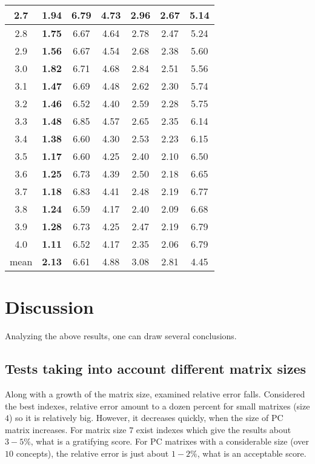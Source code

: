 \begin{table}[h]
\begin{center}
\begin{tabular}{|c||c|c|c|c|c|c|}
2.7 & \textbf{1.94} & 6.79 & 4.73 & 2.96 & 2.67 & 5.14 \\ \hline
2.8 & \textbf{1.75} & 6.67 & 4.64 & 2.78 & 2.47 & 5.24 \\ \hline
2.9 & \textbf{1.56} & 6.67 & 4.54 & 2.68 & 2.38 & 5.60 \\ \hline
3.0 & \textbf{1.82} & 6.71 & 4.68 & 2.84 & 2.51 & 5.56 \\ \hline
3.1 & \textbf{1.47} & 6.69 & 4.48 & 2.62 & 2.30 & 5.74 \\ \hline
3.2 & \textbf{1.46} & 6.52 & 4.40 & 2.59 & 2.28 & 5.75 \\ \hline
3.3 & \textbf{1.48} & 6.85 & 4.57 & 2.65 & 2.35 & 6.14 \\ \hline
3.4 & \textbf{1.38} & 6.60 & 4.30 & 2.53 & 2.23 & 6.15 \\ \hline
3.5 & \textbf{1.17} & 6.60 & 4.25 & 2.40 & 2.10 & 6.50 \\ \hline
3.6 & \textbf{1.25} & 6.73 & 4.39 & 2.50 & 2.18 & 6.65 \\ \hline
3.7 & \textbf{1.18} & 6.83 & 4.41 & 2.48 & 2.19 & 6.77 \\ \hline
3.8 & \textbf{1.24} & 6.59 & 4.17 & 2.40 & 2.09 & 6.68 \\ \hline
3.9 & \textbf{1.28} & 6.73 & 4.25 & 2.47 & 2.19 & 6.79 \\ \hline
4.0 & \textbf{1.11} & 6.52 & 4.17 & 2.35 & 2.06 & 6.79 \\ \hline \hline
mean & \textbf{2.13} & 6.61 & 4.88 & 3.08 & 2.81 & 4.45 \\ \hline 
\end{tabular}
\end{center}
\end{table}

\section{Discussion}
Analyzing the above results, one can draw several conclusions.

\subsection{Tests taking into account different matrix sizes}
Along with a growth of the matrix size, examined relative error falls. Considered the best indexes, relative error amount to a dozen percent for small matrixes (size $4$) so it is relatively big. However, it decreases quickly, when the size of PC matrix increases. For matrix size $7$ exist indexes which give the results about $3 - 5 \%$, what is a gratifying score. For PC matrixes with a considerable size (over $10$ concepts), the relative error is just about $1 - 2 \%$, what is an acceptable score.


